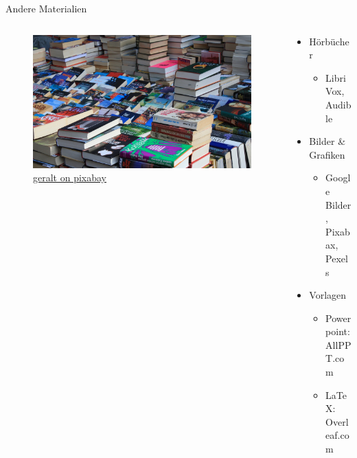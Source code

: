 \begin{frame}{Andere Materialien}
    \begin{columns}[t]
        \begin{column}{0.39\textwidth}      
            \vspace{-2em} 
            \begin{figure}[t]
                \begin{flushleft}
                    \includegraphics[height=0.8\textheight,trim={11cm 0 15cm 0},clip]{graphics/Flohmarkt.jpg}         
                    \caption*{\href{https://pixabay.com/de/photos/flohmarkt-bücher-kiste-stöbern-237460/}{geralt on pixabay}}    
                \end{flushleft}
            \end{figure}
        \end{column}          
        \begin{column}{0.69\textwidth}
            \begin{itemize}
                \item Hörbücher
                \begin{itemize}
                    \item LibriVox, Audible 
                \end{itemize}
                \item Bilder \& Grafiken
                \begin{itemize}
                    \item Google Bilder, Pixabax, Pexels
                \end{itemize}
                \item Vorlagen
                \begin{itemize}
                    \item Powerpoint: AllPPT.com
                    \item \LaTeX: Overleaf.com
                \end{itemize}

            \end{itemize}           
        \end{column}        
    \end{columns}    
\end{frame}

